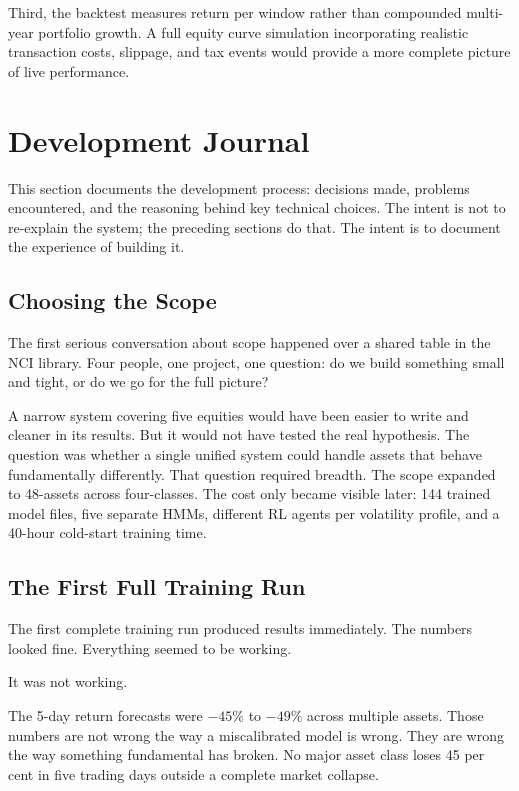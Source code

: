 \documentclass[journal]{IEEEtran}
\begin{document}
Third, the backtest measures return per window rather than compounded
multi-year portfolio growth. A full equity curve simulation incorporating
realistic transaction costs, slippage, and tax events would provide a
more complete picture of live performance.

\section{Development Journal}
\label{sec:journal}

This section documents the development process: decisions made, problems
encountered, and the reasoning behind key technical choices. The intent
is not to re-explain the system; the preceding sections do that. The
intent is to document the experience of building it.

\subsection*{Choosing the Scope}

The first serious conversation about scope happened over a shared table
in the NCI library. Four people, one project, one question: do we build
something small and tight, or do we go for the full picture?

A narrow system covering five equities would have been easier to write
and cleaner in its results. But it would not have tested the real
hypothesis. The question was whether a single unified system could
handle assets that behave fundamentally differently. That question
required breadth. The scope expanded to 48-assets across four-classes.
The cost only became visible later: 144 trained model files, five
separate HMMs, different RL agents per volatility profile, and a
40-hour cold-start training time.

\subsection*{The First Full Training Run}

The first complete training run produced results immediately. The
numbers looked fine. Everything seemed to be working.

It was not working.

The 5-day return forecasts were $-45\%$ to $-49\%$ across multiple
assets. Those numbers are not wrong the way a miscalibrated model is
wrong. They are wrong the way something fundamental has broken. No
major asset class loses 45 per cent in five trading days outside a
complete market collapse.
\end{document}
